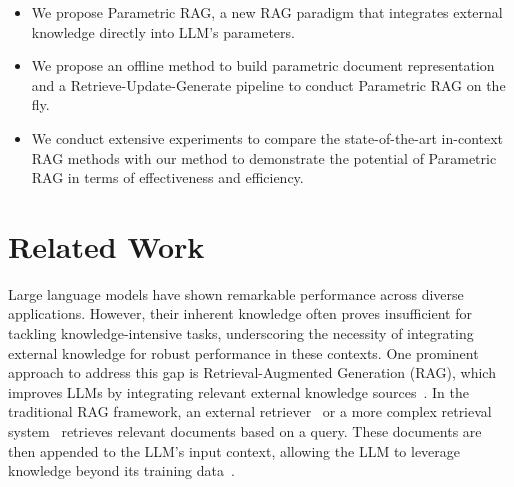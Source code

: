 \documentclass[sigconf,natbib=true,anonymous=false]{acmart}
\begin{document}
\begin{itemize}[leftmargin=*]


\item We propose Parametric RAG, a new RAG paradigm that integrates external knowledge directly into LLM's parameters.


\item We propose an offline method to build parametric document representation and a Retrieve-Update-Generate pipeline to conduct Parametric RAG on the fly.

\item We conduct extensive experiments to compare the state-of-the-art in-context RAG methods with our method to demonstrate the potential of Parametric RAG in terms of effectiveness and efficiency. 


\end{itemize}


\section{Related Work}
\label{sec-related}

Large language models have shown remarkable performance across diverse applications. However, their inherent knowledge often proves insufficient for tackling knowledge-intensive tasks, underscoring the necessity of integrating external knowledge for robust performance in these contexts.
One prominent approach to address this gap is Retrieval-Augmented Generation (RAG), which improves LLMs by integrating relevant external knowledge sources~\cite{borgeaud2022improving,lewis2020retrieval,wang2024knowledge,su2024stard,wang2024lekube,guu2020retrieval,izacard2020leveraging,dong2025decoupling,jiang2022retrieval,shi2023replug}. 
In the traditional RAG framework, an external retriever~\cite{zhai2008statistical,su2023caseformer,robertson2009probabilistic,su2023wikiformer,ma2023caseencoder,dong2023i3,su2023thuir2} or a more complex retrieval system~\cite{salemi2024towards,li2023towards} retrieves relevant documents based on a query. 
These documents are then appended to the LLM's input context, allowing the LLM to leverage knowledge beyond its training data~\cite{lewis2020retrieval}.
\end{document}
